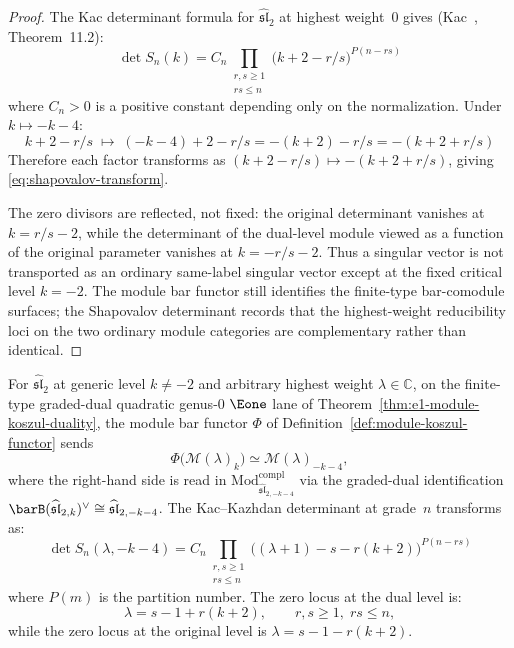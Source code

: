 \begin{proof}
The Kac determinant formula for $\widehat{\mathfrak{sl}}_2$ at
highest weight~$0$ gives
(Kac~\cite{Kac}, Theorem~11.2):
\begin{equation}\label{eq:kac-det-sl2}
\det S_n(k) = C_n \prod_{\substack{r,s \geq 1 \\ rs \leq n}}
\bigl(k + 2 - r/s\bigr)^{P(n-rs)}
\end{equation}
where $C_n > 0$ is a positive constant depending only on the
normalization. Under $k \mapsto -k-4$:
\[
k + 2 - r/s \;\longmapsto\; (-k-4) + 2 - r/s
= -(k+2) - r/s = -(k + 2 + r/s)
\]
Therefore each factor transforms as
$(k+2-r/s) \mapsto -(k+2+r/s)$, giving
\eqref{eq:shapovalov-transform}.

The zero divisors are reflected, not fixed: the original determinant
vanishes at $k=r/s-2$, while the determinant of the dual-level module
viewed as a function of the original parameter vanishes at
$k=-r/s-2$. Thus a singular vector is not transported as an
ordinary same-label singular vector except at the fixed critical
level $k=-2$. The module bar functor still identifies the finite-type
bar-comodule surfaces; the Shapovalov determinant records that the
highest-weight reducibility loci on the two ordinary module categories
are complementary rather than identical.
\end{proof}

\begin{proposition}
\label{prop:nonvacuum-verma-koszul}
For $\widehat{\mathfrak{sl}}_2$ at generic level $k \neq -2$ and
arbitrary highest weight $\lambda \in \mathbb{C}$, on the finite-type
graded-dual quadratic genus-$0$ $\Eone$ lane of
Theorem~\ref{thm:e1-module-koszul-duality}, the module bar functor
$\Phi$ of Definition~\ref{def:module-koszul-functor} sends
\begin{equation}\label{eq:nonvacuum-verma-koszul}
\Phi\bigl(\mathcal{M}(\lambda)_k\bigr) \simeq
\mathcal{M}(\lambda)_{-k-4},
\end{equation}
where the right-hand side is read in
$\mathrm{Mod}^{\mathrm{compl}}_{\widehat{\mathfrak{sl}}_{2,-k-4}}$ via
the graded-dual identification
$\barB(\widehat{\mathfrak{sl}}_{2,k})^\vee
\cong \widehat{\mathfrak{sl}}_{2,-k-4}$.
The Kac--Kazhdan determinant at grade~$n$ transforms as:
\begin{equation}\label{eq:kk-general-transform}
\det S_n(\lambda, -k\!-\!4) = C_n
\prod_{\substack{r,s \geq 1 \\ rs \leq n}}
\bigl((\lambda+1) - s - r(k+2)\bigr)^{P(n-rs)}
\end{equation}
where $P(m)$ is the partition number.
The zero locus at the dual level is:
\begin{equation}\label{eq:dual-singular-locus}
\lambda = s - 1 + r(k+2), \qquad r,s \geq 1,\; rs \leq n,
\end{equation}
while the zero locus at the original level is $\lambda = s - 1 - r(k+2)$.
\end{proposition}

